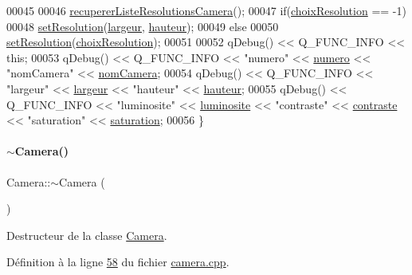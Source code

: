 \begin{DoxyCode}
00045 
00046     \hyperlink{class_camera_a97267488c5756b4217d4e1fbc68008fd}{recupererListeResolutionsCamera}();
00047     \textcolor{keywordflow}{if}(\hyperlink{class_camera_a3fdddf6f548f04d7bdc26f32602a03d4}{choixResolution} == -1)
00048         \hyperlink{class_camera_a966d13a5bf22c776f8d776d3da19182a}{setResolution}(\hyperlink{class_camera_ad64f26cdfc5aa561208b273d430938cf}{largeur}, \hyperlink{class_camera_a5d89d7f9d1a5eab4175dd168c7fbf1c7}{hauteur});
00049     \textcolor{keywordflow}{else}
00050         \hyperlink{class_camera_a966d13a5bf22c776f8d776d3da19182a}{setResolution}(\hyperlink{class_camera_a3fdddf6f548f04d7bdc26f32602a03d4}{choixResolution});
00051 
00052     qDebug() << Q\_FUNC\_INFO << \textcolor{keyword}{this};
00053     qDebug() << Q\_FUNC\_INFO << \textcolor{stringliteral}{"numero"} << \hyperlink{class_camera_ae5cda5df3c9c49b88fff15389a1bbc64}{numero} << \textcolor{stringliteral}{"nomCamera"} << 
      \hyperlink{class_camera_ac1cdaf82921d2a2f3f941d867718eba2}{nomCamera};
00054     qDebug() << Q\_FUNC\_INFO << \textcolor{stringliteral}{"largeur"} << \hyperlink{class_camera_ad64f26cdfc5aa561208b273d430938cf}{largeur} << \textcolor{stringliteral}{"hauteur"} << 
      \hyperlink{class_camera_a5d89d7f9d1a5eab4175dd168c7fbf1c7}{hauteur};
00055     qDebug() << Q\_FUNC\_INFO << \textcolor{stringliteral}{"luminosite"} << \hyperlink{class_camera_aca5433bf19773161142d73009469b1ed}{luminosite} << \textcolor{stringliteral}{"contraste"} << 
      \hyperlink{class_camera_ad3b300e52c91341d985d3b54f562a0f7}{contraste} << \textcolor{stringliteral}{"saturation"} << \hyperlink{class_camera_afd46d6d2451ee33b68dbc74713f2687c}{saturation};
00056 \}
\end{DoxyCode}
\mbox{\label{class_camera_ad1897942d0ccf91052386388a497349f}} 
\paragraph{\texorpdfstring{$\sim$\+Camera()}{~Camera()}}
{\footnotesize\ttfamily Camera\+::$\sim$\+Camera (\begin{DoxyParamCaption}{ }\end{DoxyParamCaption})}



Destructeur de la classe \hyperlink{class_camera}{Camera}. 



Définition à la ligne \hyperlink{camera_8cpp_source_l00058}{58} du fichier \hyperlink{camera_8cpp_source}{camera.\+cpp}.



